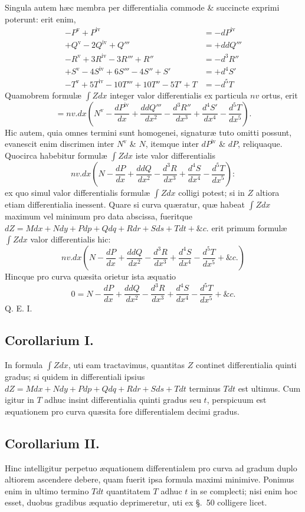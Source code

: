 Singula autem hæc membra per differentialia commode \& succincte exprimi poterunt: erit enim,
\[\begin{aligned}
-P^{\mathrm{v}}+P^{\mathrm{iv}}&=-dP^{\mathrm{iv}}\\
+Q^{\mathrm{v}}-2Q^{\mathrm{iv}}+Q'''&=+ddQ'''\\
-R^{\mathrm{v}}+3R^{\mathrm{iv}}-3R'''+R''&=-d^3R''\\
+S^{\mathrm{v}}-4S^{\mathrm{iv}}+6S'''-4S''+S'&=+d^4S'\\
-T^{\mathrm{v}}+5T^{\mathrm{iv}}-10T'''+10T''-5T'+T&=-d^5T
\end{aligned}\]
Quamobrem formulæ $\int Zdx$ integer valor differentialis ex particula $nv$ ortus, erit
\[=nv.dx\left(N^{\mathrm{v}}-\frac{dP^{\mathrm{iv}}}{dx}+\frac{ddQ'''}{dx^2}-\frac{d^3R''}{dx^3}+\frac{d^4S'}{dx^4}-\frac{d^5T}{dx^5}\right).\]
Hic autem, quia omnes termini sunt homogenei, signaturæ tuto omitti possunt, evanescit enim discrimen inter $N^{\mathrm{v}}$ \& $N$, itemque inter $dP^{\mathrm{iv}}$ \& $dP$, reliquaque. Quocirca habebitur formulæ $\int Zdx$ iste valor differentialis
\[nv.dx\left(N-\frac{dP}{dx}+\frac{ddQ}{dx^2}-\frac{d^3R}{dx^3}+\frac{d^4S}{dx^4}-\frac{d^5T}{dx^5}\right):\]
ex quo simul valor differentialis formulæ $\int Zdx$ colligi potest; si in $Z$ altiora etiam differentialia inessent. Quare si curva quæratur, quæ habeat $\int Zdx$ maximum vel minimum pro data abscissa, fueritque $dZ=Mdx+Ndy+Pdp+Qdq+Rdr+Sds+Tdt+\&c.$ erit primum formulæ $\int Zdx$ valor differentialis hic:
\[nv.dx\left(N-\frac{dP}{dx}+\frac{ddQ}{dx^2}-\frac{d^3R}{dx^3}+\frac{d^4S}{dx^4}-\frac{d^5T}{dx^5}+\&c.\right)\]
Hincque pro curva quæsita orietur ista æquatio
\[0=N-\frac{dP}{dx}+\frac{ddQ}{dx^2}-\frac{d^3R}{dx^3}+\frac{d^4S}{dx^4}-\frac{d^5T}{dx^5}+\&c.\]
Q. E. I.

\subsection*{Corollarium I.}
In formula $\int Zdx$, uti eam tractavimus, quantitas $Z$ continet differentialia quinti gradus; si quidem in differentiali ipsius $dZ=Mdx+Ndy+Pdp+Qdq+Rdr+Sds+Tdt$ terminus $Tdt$ est ultimus. Cum igitur in $T$ adhuc insint differentialia quinti gradus seu $t$, perspicuum est æquationem pro curva quæsita fore differentialem decimi gradus.

\subsection*{Corollarium II.}
Hinc intelligitur perpetuo æquationem differentialem pro curva ad gradum duplo altiorem ascendere debere, quam fuerit ipsa formula maximi minimive. Ponimus enim in ultimo termino $Tdt$ quantitatem $T$ adhuc $t$ in se complecti; nisi enim hoc esset, duobus gradibus æquatio deprimeretur, uti ex §.~50 colligere licet.

